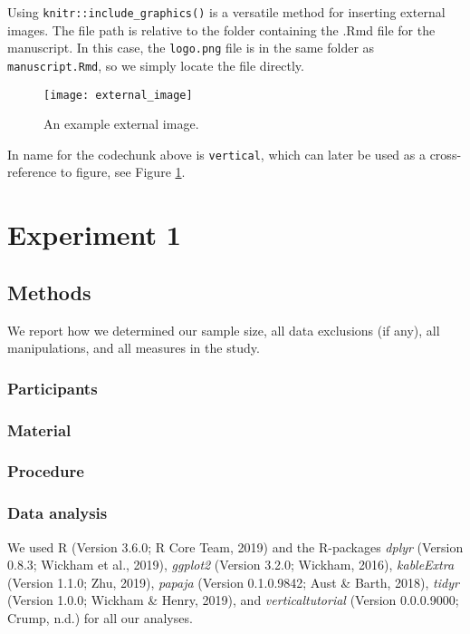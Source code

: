 \documentclass[
  man]{apa6}
\begin{document}
Using \texttt{knitr::include\_graphics()} is a versatile method for inserting external images. The file path is relative to the folder containing the .Rmd file for the manuscript. In this case, the \texttt{logo.png} file is in the same folder as \texttt{manuscript.Rmd}, so we simply locate the file directly.

\begin{figure}
\texttt{[image: external\_image]} \caption{An example external image.}\label{fig:vertical}
\end{figure}

In name for the codechunk above is \texttt{vertical}, which can later be used as a cross-reference to figure, see Figure \ref{fig:vertical}.

\hypertarget{experiment-1}{%
\section{Experiment 1}\label{experiment-1}}

\hypertarget{methods}{%
\subsection{Methods}\label{methods}}

We report how we determined our sample size, all data exclusions (if any), all manipulations, and all measures in the study.

\hypertarget{participants}{%
\subsubsection{Participants}\label{participants}}

\hypertarget{material}{%
\subsubsection{Material}\label{material}}

\hypertarget{procedure}{%
\subsubsection{Procedure}\label{procedure}}

\hypertarget{data-analysis}{%
\subsubsection{Data analysis}\label{data-analysis}}

We used R (Version 3.6.0; R Core Team, 2019) and the R-packages \emph{dplyr} (Version 0.8.3; Wickham et al., 2019), \emph{ggplot2} (Version 3.2.0; Wickham, 2016), \emph{kableExtra} (Version 1.1.0; Zhu, 2019), \emph{papaja} (Version 0.1.0.9842; Aust \& Barth, 2018), \emph{tidyr} (Version 1.0.0; Wickham \& Henry, 2019), and \emph{verticaltutorial} (Version 0.0.0.9000; Crump, n.d.) for all our analyses.
\end{document}
